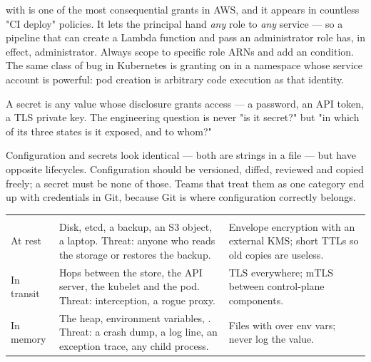 \begin{secwarn}
 with  is one of the most consequential grants in AWS, and it appears in countless "CI deploy" policies. It lets the principal hand \emph{any} role to \emph{any} service --- so a pipeline that can create a Lambda function and pass an administrator role has, in effect, administrator. Always scope  to specific role ARNs and add an  condition. The same class of bug in Kubernetes is granting  on  in a namespace whose service account is powerful: pod creation is arbitrary code execution as that identity.
\end{secwarn}


 A secret is any value whose disclosure grants access --- a password, an API token, a TLS private key. The engineering question is never "is it secret?" but "in which of its three states is it exposed, and to whom?"

 Configuration and secrets look identical --- both are strings in a file --- but have opposite lifecycles. Configuration should be versioned, diffed, reviewed and copied freely; a secret must be none of those. Teams that treat them as one category end up with credentials in Git, because Git is where configuration correctly belongs.


\begin{center}\small
\wbrowcolors
\begin{tabularx}{\linewidth}{@{}L{22mm} X L{34mm}@{}}
 &  & \\
At rest & Disk, etcd, a backup, an S3 object, a laptop. Threat: anyone who reads the storage or restores the backup. & Envelope encryption with an external KMS; short TTLs so old copies are useless.\\
In transit & Hops between the store, the API server, the kubelet and the pod. Threat: interception, a rogue proxy. & TLS everywhere; mTLS between control-plane components.\\
In memory & The heap, environment variables, . Threat: a crash dump, a log line, an exception trace, any child process. & Files with  over env vars; never log the value.\\
\end{tabularx}
\end{center}


